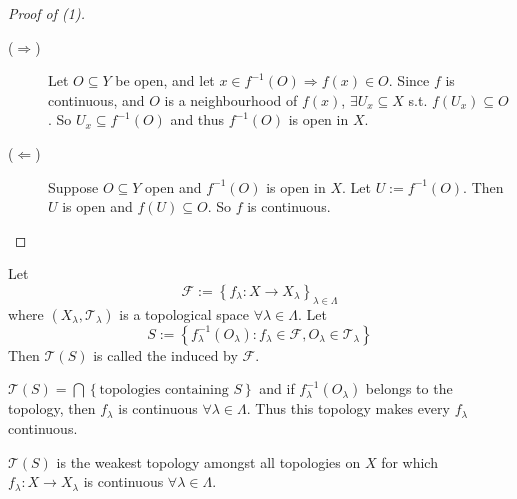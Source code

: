 \begin{proof}[Proof of (1)] \leavevmode
    \begin{description} 
        \item[($\Rightarrow$)] Let $O \subseteq Y$ be open, and let $ x \in f^{-1}(O) \Rightarrow 
        f(x) \in O$. Since $f$ is continuous, and $O$ is a neighbourhood of $f(x)$, $\exists U_x 
        \subseteq X$ s.t. $f(U_x) \subseteq O$. So $U_x \subseteq f^{-1}(O)$ and thus $f^{-1}(O)$
        is open in $X$.
        
        \item[($\Leftarrow$)] Suppose $O \subseteq Y$ open and $f^{-1}(O)$ is open in $X$.
        Let $U := f^{-1}(O)$. Then $U $ is open and $f(U) \subseteq O$. So $f$ is continuous. \qedhere       
    \end{description}
\end{proof}

\begin{defn}
    Let \[\mathcal{F} := \left\{ f_\lambda : X \to X_\lambda \right\}_{\lambda \in \Lambda} \] where $(X_\lambda,
    \mathcal{T}_\lambda)$ is a topological space $\forall \lambda \in \Lambda$. 
    Let \[S := \left\{ f_\lambda^{-1}(O_\lambda) : f_\lambda \in \mathcal{F}, O_\lambda \in 
    \mathcal{T}_\lambda \right\} \] Then $\mathcal{T}(S)$ is called the  
    induced by $\mathcal{F}$.
\end{defn}

\begin{rem}
    $\mathcal{T}(S) = \bigcap \left\{ \text{topologies containing } S \right\} $ and if 
    $f_\lambda^{-1}(O_\lambda)$ belongs to the topology, then $f_\lambda $ is continuous $\forall 
    \lambda \in \Lambda$. Thus this topology makes every $f_\lambda$ continuous.
\end{rem}

\begin{cor}
    $\mathcal{T}(S)$ is the weakest topology amongst all topologies on $X$ for which
    $f_\lambda : X \to X_\lambda$ is continuous $\forall \lambda \in \Lambda$.    
\end{cor}

